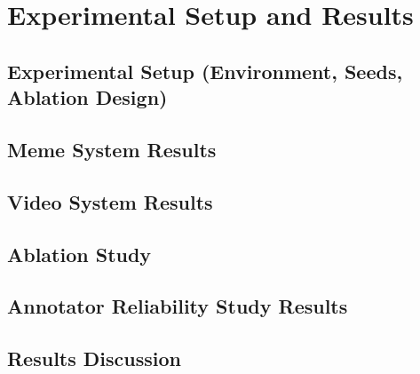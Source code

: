 \chapter{Experimental Setup and Results}\label{cap:experimental-setup-results}

\section{Experimental Setup (Environment, Seeds, Ablation Design)}\label{sec:experimental-setup}

\section{Meme System Results}\label{sec:meme-system-results}

\section{Video System Results}\label{sec:video-system-results}

\section{Ablation Study}\label{sec:ablation-study}

\section{Annotator Reliability Study Results}\label{sec:annotator-reliability-study-results}

\section{Results Discussion}\label{sec:results-discussion}
